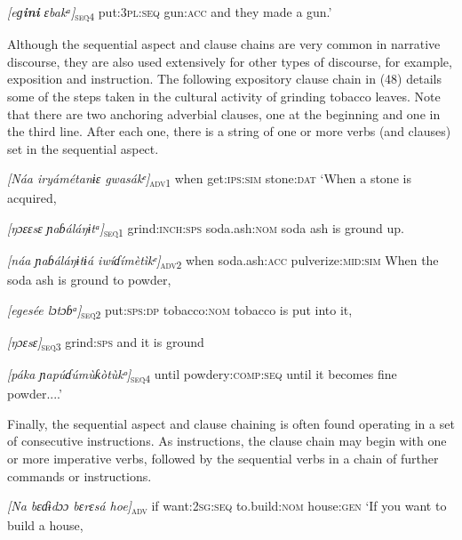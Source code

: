 \textit{[eɡ}\textbf{\textit{ini}}\textit{      ɛbakᵃ]}\textsc{\textsubscript{seq4}}
put:\textsc{3pl}:\textsc{seq}     gun:\textsc{acc}
and they made a gun.’


Although the sequential aspect and clause chains are very common in narrative discourse, they are also used extensively for other types of discourse, for example, exposition and instruction. The following expository clause chain in (48) details some of the steps taken in the cultural activity of grinding tobacco leaves. Note that there are two anchoring adverbial clauses, one at the beginning and one in the third line. After each one, there is a string of one or more verbs (and clauses) set in the sequential aspect. 



\textit{[Náa   iryámétanɨɛ   gwasákᵉ]}\textsc{\textsubscript{adv1}}
when   get:\textsc{ips:sim}   stone:\textsc{dat}
‘When a stone is acquired,



\textit{[ŋɔɛ}\textit{ɛsɛ}\textit{     ɲaɓáláŋɨtᵃ]}\textsc{\textsubscript{seq1}}
grind:\textsc{inch:sps}   soda.ash:\textsc{nom}
soda ash is ground up.



\textit{[náa   ɲaɓáláŋɨtɨá     iwíɗímètìkᵉ]}\textsc{\textsubscript{adv2}}
when   soda.ash:\textsc{acc}   pulverize:\textsc{mid:sim}
When the soda ash is ground to powder,



\textit{[eg}\textit{esé}\textit{e   lɔtɔɓᵃ]}\textsc{\textsubscript{seq2}}
put:\textsc{sps:dp}   tobacco:\textsc{nom}
tobacco is put into it,



\textit{[ŋɔ}\textit{ɛsɛ}\textit{]}\textsc{\textsubscript{seq3}}
grind:\textsc{sps}
and it is ground



\textit{[páka ɲapúɗúmùƙòtù}\textit{kᵒ}\textit{]}\textsc{\textsubscript{seq4}}
until powdery:\textsc{comp:seq}
until it becomes fine powder....’


Finally, the sequential aspect and clause chaining is often found operating in a set of consecutive instructions. As instructions, the clause chain may begin with one or more imperative verbs, followed by the sequential verbs in a chain of further commands or instructions.



\textit{[Na   bɛɗɨdɔɔ     bɛrɛsá   hoe]}\textsc{\textsubscript{adv}}
if   want:\textsc{2sg:seq}   to.build:\textsc{nom}  house:\textsc{gen}
‘If you want to build a house,



